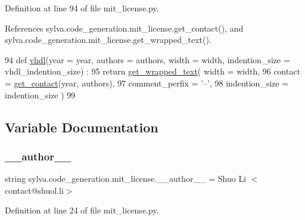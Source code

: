 Definition at line 94 of file mit\+\_\+license.\+py.



References sylva.\+code\+\_\+generation.\+mit\+\_\+license.\+get\+\_\+contact(), and sylva.\+code\+\_\+generation.\+mit\+\_\+license.\+get\+\_\+wrapped\+\_\+text().


\begin{DoxyCode}
94 \textcolor{keyword}{def }\hyperlink{namespacesylva_1_1code__generation_1_1mit__license_a5c8d9ae3b2d4db392cdc66e37b035675}{vhdl}(year = year, authors = authors, width = width, indention\_size = vhdl\_indention\_size) :
95   \textcolor{keywordflow}{return} \hyperlink{namespacesylva_1_1code__generation_1_1mit__license_a85d377334cea2a76d3664a6a8981638f}{get\_wrapped\_text}( width = width,
96                            contact = \hyperlink{namespacesylva_1_1code__generation_1_1mit__license_a7cf6054f669c578c4c64370849e8edc2}{get\_contact}(year, authors),
97                            comment\_perfix = \textcolor{stringliteral}{'--'},
98                            indention\_size = indention\_size )
99 
\end{DoxyCode}


\subsection{Variable Documentation}
\mbox{\label{namespacesylva_1_1code__generation_1_1mit__license_a52a488c113051a959c0c636a4f8bb481}} 
\subsubsection{\texorpdfstring{\+\_\+\+\_\+author\+\_\+\+\_\+}{\_\_author\_\_}}
{\footnotesize\ttfamily string sylva.\+code\+\_\+generation.\+mit\+\_\+license.\+\_\+\+\_\+author\+\_\+\+\_\+ = \textquotesingle{}Shuo Li $<$contact@shuol.\+li$>$\textquotesingle{}\hspace{0.3cm}{\ttfamily [private]}}



Definition at line 24 of file mit\+\_\+license.\+py.

